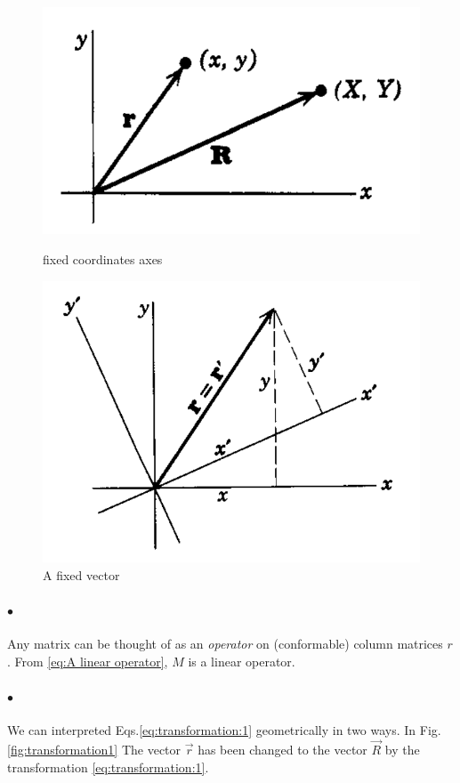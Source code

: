             \begin{figure}
                \includegraphics[width=0.9\linewidth]{figures/transformation1.png}
                \caption{fixed coordinates axes}
                \label{fig:transformation1}
                \includegraphics[width=0.9\linewidth]{figures/transformation2.png}
                \caption{A fixed vector}
                \label{fig:transformation2}
            \end{figure}

            \paragraph{$\bullet$}Any matrix can be thought of as an \textit{operator} 
            on (conformable) column matrices $r$. From \eqref{eq:A linear operator}, $M$ is a linear operator.
            
            \paragraph{$\bullet$}We can interpreted Eqs.\eqref{eq:transformation:1} geometrically in two ways. In Fig.\eqref{fig:transformation1}
            The vector $\vec{r}$ has been changed to the vector $\vec{R}$ by the transformation \eqref{eq:transformation:1}.
            
